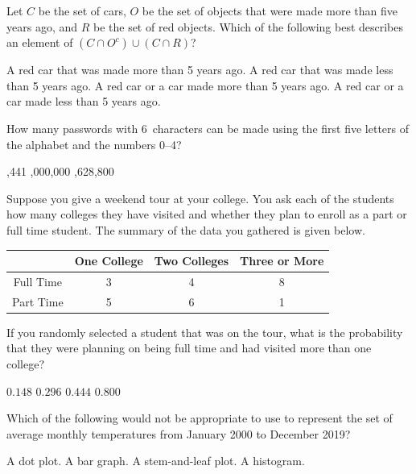 \documentclass[12pt,letterpaper,answers]{exam}
\begin{document}
\begin{questions}
\vfill

\question Let $C$ be the set of cars, $O$ be the set of objects that were made more than five years ago, and $R$ be the set of red objects. Which of the following best describes an element of $(C \cap O^c) \cup (C \cap R)$?
	\begin{choices}
	\choice A red car that was made more than 5 years ago.
	\choice A red car that was made less than 5 years ago.
	\choice A red car or a car made more than 5 years ago.
	\CorrectChoice A red car or a car made less than 5 years ago.
	\end{choices}

\vfill

\question How many passwords with 6~characters can be made using the first five letters of the alphabet and the numbers 0--4?
	\begin{choices}
	\choice 10
	,441
	,000,000
	,628,800
	\end{choices}

\vfill

\question Suppose you give a weekend tour at your college. You ask each of the students how many colleges they have visited and whether they plan to enroll as a part or full time student. The summary of the data you gathered is given below. \par
	\begin{table}[H]
	\centering
	\begin{tabular}{|c|c|c|c|} \hline
	& One College & Two Colleges & Three or More \\ \hline
	Full Time & 3 & 4 & 8 \\ \hline
	Part Time & 5 & 6 & 1 \\ \hline
	\end{tabular}
	\end{table} \par
If you randomly selected a student that was on the tour, what is the probability that they were planning on being full time and had visited more than one college?
	\begin{choices}
	\choice $0.148$
	\choice $0.296$
	\CorrectChoice $\mathbf{0.444}$
	\choice $0.800$
	\end{choices}

\vfill

\question Which of the following would not be appropriate to use to represent the set of average monthly temperatures from January 2000 to December 2019?
	\begin{choices}
	\choice A dot plot.
	\CorrectChoice A bar graph.
	\choice A stem-and-leaf plot.
	\choice A histogram.
	\end{choices}


\end{questions}
\end{document}
